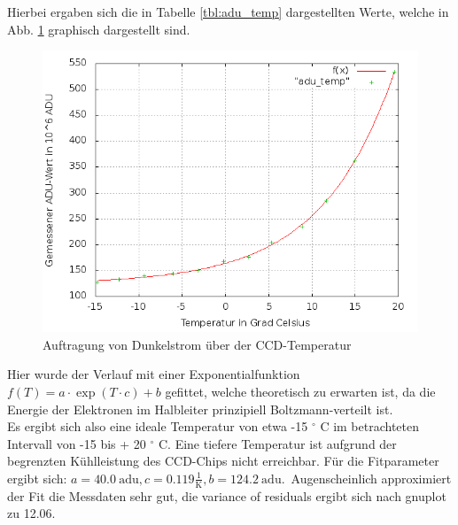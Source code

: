 Hierbei ergaben sich die in Tabelle \ref{tbl:adu_temp} dargestellten Werte, welche in Abb. \ref{fig:adu_temp} graphisch dargestellt sind. 
\begin{figure}[h!]
\centering
        \includegraphics[width=.9\textwidth]{plot_adu_temp2.png}
\caption{ Auftragung von Dunkelstrom über der CCD-Temperatur }
\label{fig:adu_temp}
\end{figure}
Hier wurde der Verlauf mit einer Exponentialfunktion $f(T) = a \cdot \exp(T \cdot c) + b$ gefittet, welche theoretisch zu erwarten ist, da die Energie der Elektronen im Halbleiter prinzipiell Boltzmann-verteilt ist. \\
Es ergibt sich also eine ideale Temperatur von etwa -15 $^\circ$ C im betrachteten Intervall von -15 bis + 20 $^\circ$ C. Eine tiefere Temperatur ist aufgrund der begrenzten Kühlleistung des CCD-Chips nicht erreichbar. Für die Fitparameter ergibt sich: 
$a = 40.0\  \mathrm{adu}, c = 0.119 \frac{1}{\mathrm{K}}, b = 124.2 \ \mathrm{adu}$.\
Augenscheinlich approximiert der Fit die Messdaten sehr gut, die variance of residuals ergibt sich nach gnuplot zu 12.06. 
